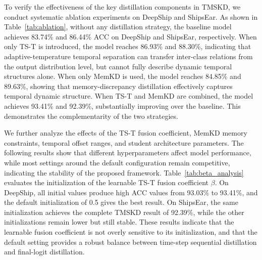 ﻿\documentclass[lettersize,journal]{IEEEtran}
\begin{document}
To verify the effectiveness of the key distillation components in TMSKD, we conduct systematic ablation experiments on DeepShip and ShipsEar. As shown in Table~\ref{tab:ablation}, without any distillation strategy, the baseline model achieves 83.74\% and 86.44\% ACC on DeepShip and ShipsEar, respectively. When only TS-T is introduced, the model reaches 86.93\% and 88.30\%, indicating that adaptive-temperature temporal separation can transfer inter-class relations from the output distribution level, but cannot fully describe dynamic temporal structures alone. When only MemKD is used, the model reaches 84.85\% and 89.63\%, showing that memory-discrepancy distillation effectively captures temporal dynamic structure. When TS-T and MemKD are combined, the model achieves 93.41\% and 92.39\%, substantially improving over the baseline. This demonstrates the complementarity of the two strategies.

We further analyze the effects of the TS-T fusion coefficient, MemKD memory constraints, temporal offset ranges, and student architecture parameters. The following results show that different hyperparameters affect model performance, while most settings around the default configuration remain competitive, indicating the stability of the proposed framework.
Table~\ref{tab:beta_analysis} evaluates the initialization of the learnable TS-T fusion coefficient $\beta$. On DeepShip, all initial values produce high ACC values from 93.03\% to 93.41\%, and the default initialization of 0.5 gives the best result. On ShipsEar, the same initialization achieves the complete TMSKD result of 92.39\%, while the other initializations remain lower but still stable. These results indicate that the learnable fusion coefficient is not overly sensitive to its initialization, and that the default setting provides a robust balance between time-step sequential distillation and final-logit distillation.
\end{document}
